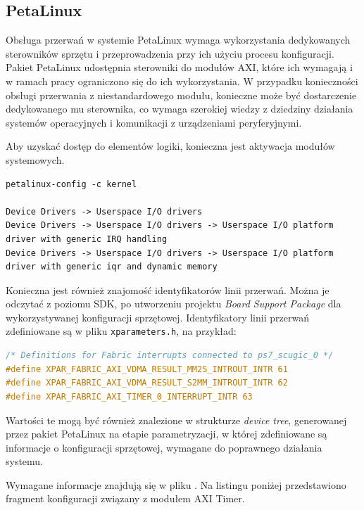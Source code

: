 \subsection{PetaLinux}

Obsługa przerwań w systemie PetaLinux wymaga wykorzystania dedykowanych sterowników sprzętu i przeprowadzenia przy ich użyciu procesu konfiguracji. Pakiet PetaLinux udostępnia sterowniki do modułów AXI, które ich wymagają i w ramach pracy ograniczono się do ich wykorzystania. W przypadku konieczności obsługi przerwania z niestandardowego modułu, konieczne może być dostarczenie dedykowanego mu sterownika, co wymaga szerokiej wiedzy z dziedziny działania systemów operacyjnych i komunikacji z urządzeniami peryferyjnymi.

Aby uzyskać dostęp do elementów logiki, konieczna jest aktywacja modułów systemowych.

\begin{lstlisting}[breaklines=true, caption=Konfiguracja modułów systemowych.]
petalinux-config -c kernel

Device Drivers -> Userspace I/O drivers
Device Drivers -> Userspace I/O drivers -> Userspace I/O platform driver with generic IRQ handling
Device Drivers -> Userspace I/O drivers -> Userspace I/O platform driver with generic iqr and dynamic memory
\end{lstlisting}

Konieczna jest również znajomość identyfikatorów linii przerwań. Można je odczytać z poziomu SDK, po utworzeniu projektu \emph{Board Support Package} dla wykorzystywanej konfiguracji sprzętowej. Identyfikatory linii przerwań zdefiniowane są w pliku \texttt{xparameters.h}, na przykład:

\begin{lstlisting}[language=C]
/* Definitions for Fabric interrupts connected to ps7_scugic_0 */
#define XPAR_FABRIC_AXI_VDMA_RESULT_MM2S_INTROUT_INTR 61
#define XPAR_FABRIC_AXI_VDMA_RESULT_S2MM_INTROUT_INTR 62
#define XPAR_FABRIC_AXI_TIMER_0_INTERRUPT_INTR 63
\end{lstlisting}

Wartości te mogą być również znalezione w strukturze \textit{device tree}, generowanej przez pakiet PetaLinux na etapie parametryzacji, w której zdefiniowane są informacje o konfiguracji sprzętowej, wymagane do poprawnego działania systemu.

Wymagane informacje znajdują się w pliku . Na listingu poniżej przedstawiono fragment konfiguracji związany z modułem AXI Timer.

